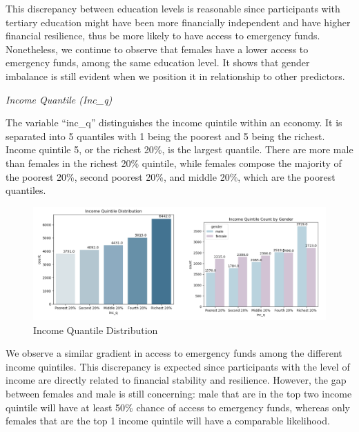 \documentclass[12pt]{article}
\begin{document}
This discrepancy between education levels is reasonable since
participants with tertiary education might have been more financially
independent and have higher financial resilience, thus be more likely to
have access to emergency funds. Nonetheless, we continue to observe that
females have a lower access to emergency funds, among the same education
level. It shows that gender imbalance is still evident when we position
it in relationship to other predictors.

\emph{Income Quantile (Inc\_q)}

The variable ``inc\_q'' distinguishes the income quintile within an
economy. It is separated into 5 quantiles with 1 being the poorest and 5
being the richest. Income quintile 5, or the richest 20\%, is the
largest quantile. There are more male than females in the richest 20\%
quintile, while females compose the majority of the poorest 20\%, second
poorest 20\%, and middle 20\%, which are the poorest quantiles.

\begin{figure}

{\centering \includegraphics[width=1\linewidth]{graphs/income_graph6} 

}

\caption{Income Quantile Distribution}\label{fig:unnamed-chunk-8}
\end{figure}

We observe a similar gradient in access to emergency funds among the
different income quintiles. This discrepancy is expected since
participants with the level of income are directly related to financial
stability and resilience. However, the gap between females and male is
still concerning: male that are in the top two income quintile will have
at least 50\% chance of access to emergency funds, whereas only females
that are the top 1 income quintile will have a comparable likelihood.
\end{document}

